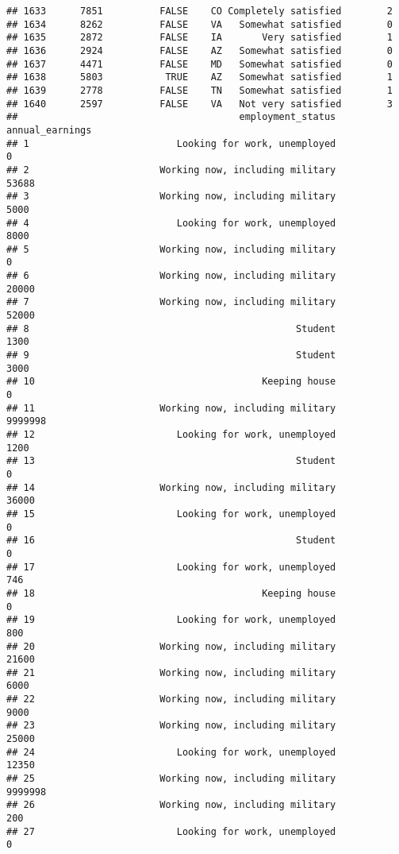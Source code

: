 \documentclass[]{book}
\theoremstyle{definition}
\theoremstyle{definition}
\theoremstyle{remark}
\begin{document}
\begin{verbatim}
## 1633      7851          FALSE    CO Completely satisfied        2
## 1634      8262          FALSE    VA   Somewhat satisfied        0
## 1635      2872          FALSE    IA       Very satisfied        1
## 1636      2924          FALSE    AZ   Somewhat satisfied        0
## 1637      4471          FALSE    MD   Somewhat satisfied        0
## 1638      5803           TRUE    AZ   Somewhat satisfied        1
## 1639      2778          FALSE    TN   Somewhat satisfied        1
## 1640      2597          FALSE    VA   Not very satisfied        3
##                                       employment_status annual_earnings
## 1                          Looking for work, unemployed               0
## 2                       Working now, including military           53688
## 3                       Working now, including military            5000
## 4                          Looking for work, unemployed            8000
## 5                       Working now, including military               0
## 6                       Working now, including military           20000
## 7                       Working now, including military           52000
## 8                                               Student            1300
## 9                                               Student            3000
## 10                                        Keeping house               0
## 11                      Working now, including military         9999998
## 12                         Looking for work, unemployed            1200
## 13                                              Student               0
## 14                      Working now, including military           36000
## 15                         Looking for work, unemployed               0
## 16                                              Student               0
## 17                         Looking for work, unemployed             746
## 18                                        Keeping house               0
## 19                         Looking for work, unemployed             800
## 20                      Working now, including military           21600
## 21                      Working now, including military            6000
## 22                      Working now, including military            9000
## 23                      Working now, including military           25000
## 24                         Looking for work, unemployed           12350
## 25                      Working now, including military         9999998
## 26                      Working now, including military             200
## 27                         Looking for work, unemployed               0

\end{verbatim}
\end{document}
